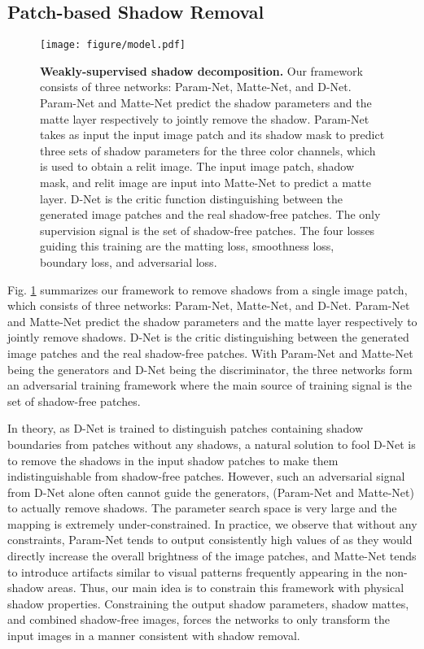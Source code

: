 \documentclass[runningheads]{llncs}
\begin{document}
\subsection{Patch-based Shadow Removal}
\label{sec:method_patch}

\begin{figure}[t!]
	\centering
  \texttt{[image: figure/model.pdf]}

  \caption{\textbf{Weakly-supervised shadow decomposition.} Our framework consists of three networks: Param-Net, Matte-Net, and D-Net. Param-Net and Matte-Net predict the shadow parameters  and the matte layer  respectively to jointly remove the shadow. Param-Net takes as input the input image patch and its shadow mask to predict three sets of shadow parameters  for the three color channels, which is used to obtain a relit image. The input image patch, shadow mask, and relit image are input into Matte-Net to predict a matte layer.  D-Net is the critic function distinguishing between the generated image patches and the real shadow-free patches. The only supervision signal is the set of shadow-free patches. The four losses guiding this training are the matting loss, smoothness loss, boundary loss, and adversarial loss.}
  \label{fig:model}
\end{figure}

Fig. \ref{fig:model} summarizes our framework to remove shadows from a single image patch, which consists of three networks: Param-Net, Matte-Net, and D-Net. Param-Net and Matte-Net predict the shadow parameters  and the matte layer  respectively to jointly remove shadows. D-Net is the critic distinguishing between the generated image patches and the real shadow-free patches. With Param-Net and Matte-Net being the generators and D-Net being the discriminator, the three networks form an adversarial training framework where the main source of training signal is the set of shadow-free patches. 

In theory, as D-Net is trained to distinguish patches containing shadow boundaries from patches without any shadows, a natural solution to fool D-Net is to remove the shadows in the input shadow patches to make them indistinguishable from shadow-free patches. However, such an adversarial signal from D-Net alone often cannot guide the generators, (Param-Net and Matte-Net) to actually remove shadows. The parameter search space is very large and the mapping is extremely under-constrained. In practice, we observe that without any constraints, Param-Net tends to output consistently high values of  as they would directly increase the overall brightness of the image patches, and Matte-Net tends to introduce artifacts similar to visual patterns frequently appearing in the non-shadow areas.
Thus, our main idea is to constrain this framework with physical shadow properties.  Constraining the output shadow parameters, shadow mattes, and combined shadow-free images, forces the networks to only transform the input images in a manner consistent with shadow removal. 
\end{document}
